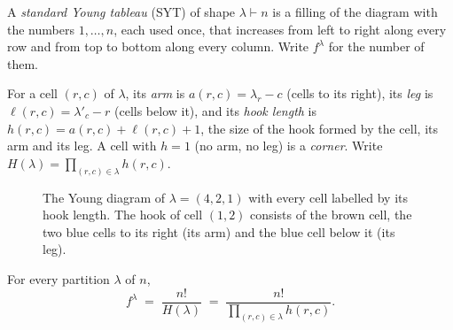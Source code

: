 \documentclass[11pt]{article}
\begin{document}
\begin{definitionbox}
A \emph{standard Young tableau} (SYT) of shape $\lambda\vdash n$ is a filling of the diagram with the numbers $1,\dots,n$, each used once, that increases from left to right along every row and from top to bottom
along every column. Write $f^\lambda$ for the number of them.
\end{definitionbox}

\begin{definitionbox}
For a cell $(r,c)$ of $\lambda$, its \emph{arm} is $a(r,c)=\lambda_r-c$ (cells to its right), its \emph{leg} is $\ell(r,c)=\lambda'_c-r$ (cells below it), and its \emph{hook length} is
$h(r,c)=a(r,c)+\ell(r,c)+1$, the size of the hook formed by the cell, its arm and its leg. A cell with $h=1$ (no arm, no leg) is a \emph{corner}.
Write $H(\lambda)=\prod_{(r,c)\in\lambda}h(r,c)$.
\end{definitionbox}

\begin{figure}[H]
\centering
{}
\caption{The Young diagram of $\lambda=(4,2,1)$ with every cell labelled by its hook length. The hook of cell $(1,2)$ consists of the brown cell, the two blue cells to its right (its arm) and the blue cell below it (its leg).}\label{fig:hl_hooks}
\end{figure}

\begin{theorembox}
For every partition $\lambda$ of $n$,
\[
  f^\lambda \;=\; \frac{n!}{H(\lambda)} \;=\; \frac{n!}{\prod_{(r,c)\in\lambda}h(r,c)}.
\]
\end{theorembox}
\end{document}
